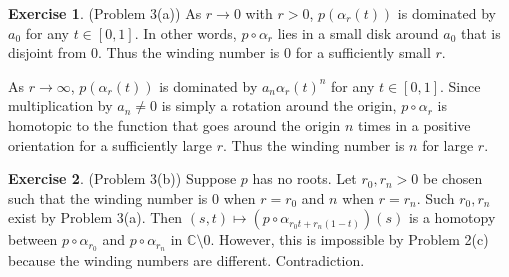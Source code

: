 \documentclass[12pt, psamsfonts]{amsart}
\theoremstyle{definition}
\newtheorem*{exer}{Exercise}
\theoremstyle{remark}
\numberwithin{equation}{section}
\begin{document}
\begin{exer}{(Problem 3(a))}
  As $r \rightarrow 0$ with $r > 0$, $p(\alpha_r(t))$ is dominated by $a_0$ for any $t \in [0, 1]$.
  In other words, $p \circ \alpha_r$ lies in a small disk around $a_0$ that is disjoint from 0.
  Thus the winding number is 0 for a sufficiently small $r$.

  As $r \rightarrow \infty$, $p(\alpha_r(t))$ is dominated by $a_n\alpha_r(t)^n$ for any $t \in [0, 1]$.
  Since multiplication by $a_n \ne 0$ is simply a rotation around the origin, $p \circ \alpha_r$ is homotopic to the function that goes around the origin $n$ times in a positive orientation for a sufficiently large $r$.
  Thus the winding number is $n$ for large $r$.
\end{exer}

\begin{exer}{(Problem 3(b))}
  Suppose $p$ has no roots.
  Let $r_0, r_n > 0$ be chosen such that the winding number is 0 when $r = r_0$ and $n$ when $r = r_n$.
  Such $r_0, r_n$ exist by Problem 3(a).
  Then $(s, t) \mapsto (p \circ \alpha_{r_0t + r_n(1 - t)})(s)$ is a homotopy between $p \circ \alpha_{r_0}$ and $p \circ \alpha_{r_n}$ in $\mathbb{C} \setminus 0$.
  However, this is impossible by Problem 2(c) because the winding numbers are different.
  Contradiction.
\end{exer}
\end{document}
